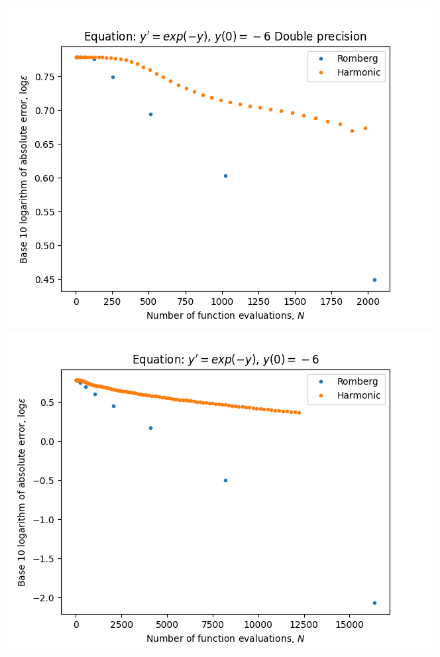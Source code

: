 \begin{figure}[H]
\centering
\begin{minipage}{0.45\textwidth}
\centering
\includegraphics[scale=0.45]{../results/emr_plots/ln_em6.png}
\end{minipage}
\begin{minipage}{0.45\textwidth}
\centering
\includegraphics[scale=0.45]{../results/emr_plots/ln_em6_hp.png}
\end{minipage}
\end{figure}

